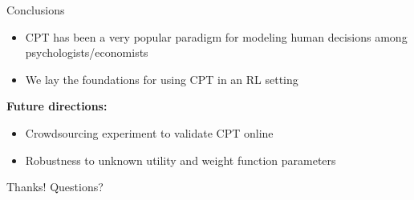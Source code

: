 \documentclass{beamer}
\begin{document}
\begin{frame}{Conclusions}
\begin{small}
\begin{itemize}
	\item \alert{CPT} has been a very popular paradigm for modeling human decisions among psychologists/economists
	\item We lay the foundations for using \alert{CPT}
	in an RL setting
\end{itemize}

\textbf{\color{bleu1} Future directions:}
\begin{itemize}
	\item \alert{Crowdsourcing} experiment to validate CPT online 
	\item \alert{Robustness} to unknown utility and weight function parameters
\end{itemize}
\end{small}
\end{frame}
\begin{frame}
\begin{center}
\LARGE{\color{bleu1} Thanks! Questions?}
\end{center}
\end{frame}
\end{document}
